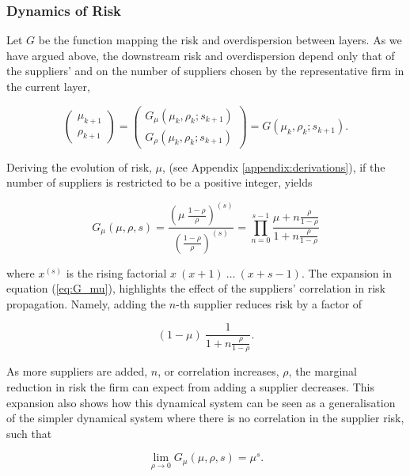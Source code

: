 \documentclass[american, abstract=on]{scrartcl}
\theoremstyle{plain}
\begin{document}
\subsubsection{Dynamics of Risk}

Let $G$ be the function mapping the risk and overdispersion between layers. As we have argued above, the downstream risk and overdispersion depend only that of the suppliers' and on the number of suppliers chosen by the representative firm in the current layer,

\begin{equation}
  \begin{pmatrix}
    \mu_{k + 1} \\ \rho_{k + 1}
  \end{pmatrix} =  \begin{pmatrix}
    G_{\mu}(\mu_k, \rho_k; s_{k + 1}) \\ G_{\rho}(\mu_k, \rho_k; s_{k + 1})
  \end{pmatrix} = G(\mu_k, \rho_k; s_{k + 1}).
\end{equation}

Deriving the evolution of risk, $\mu$, (see Appendix \ref{appendix:derivations}), if the number of suppliers is restricted to be a positive integer, yields

\begin{equation} \label{eq:G_mu}
  G_\mu(\mu, \rho, s) = \frac{\left( \mu \  \frac{1 - \rho}{\rho} \right)^{(s)}}{\left( \frac{1 - \rho}{\rho} \right)^{(s)}} = \prod^{s - 1}_{n = 0} \frac{\mu + n \frac{\rho}{1 - \rho}}{1 + n \frac{\rho}{1 - \rho}}
\end{equation}

where $x^{(s)}$ is the rising factorial $x \ (x + 1) \ \ldots \ (x + s - 1)$. The expansion in equation (\ref{eq:G_mu}), highlights the effect of the suppliers' correlation in risk propagation. Namely, adding the $n$-th supplier reduces risk by a factor of 

\begin{equation}
  (1 - \mu) \ \frac{1}{1 + n \frac{\rho}{1 - \rho}}.
\end{equation}

As more suppliers are added, $n$, or correlation increases, $\rho$, the marginal reduction in risk the firm can expect from adding a supplier decreases. This expansion also shows how this dynamical system can be seen as a generalisation of the simpler dynamical system where there is no correlation in the supplier risk, such that

\begin{equation}
  \lim_{\rho \rightarrow 0} G_\mu(\mu, \rho, s) = \mu^s.
\end{equation}
\end{document}
